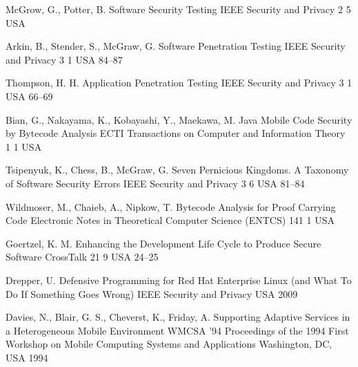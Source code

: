 \begin{thebibliography}{9}
		{McGrow, G., Potter, B.} %
		{Software Security Testing}
		{{IEEE} Security and Privacy}
		{2}
		{5}
		{USA}
		{}
		{}
	
		{Arkin, B., Stender, S., McGraw, G.} %
		{Software Penetration Testing}
		{{IEEE} Security and Privacy}
		{3}
		{1}
		{USA}
		{}
		{84--87}
	
		{Thompson, H. H.} %
		{Application Penetration Testing}
		{{IEEE} Security and Privacy}
		{3}
		{1}
		{USA}
		{}
		{66--69}
	
		{Bian, G., Nakayama, K., Kobayashi, Y., Maekawa, M.} %
		{Java Mobile Code Security by Bytecode Analysis}
		{{ECTI} Transactions on Computer and Information Theory}
		{1}
		{1}
		{USA}
		{}
		{}
	
		{Tsipenyuk, K., Chess, B., McGraw, G.} %
		{Seven Pernicious Kingdoms. A Taxonomy of Software Security Errors}
		{{IEEE} Security and Privacy}
		{3}
		{6}
		{USA}
		{}
		{81--84}
	
		{Wildmoser, M., Chaieb, A., Nipkow, T.} %
		{Bytecode Analysis for Proof Carrying Code}
		{Electronic Notes in Theoretical Computer Science ({ENTCS})}
		{141}
		{1}
		{USA}
		{}
		{}
	
		{Goertzel, K. M.} %
		{Enhancing the Development Life Cycle to Produce Secure Software}
		{CrossTalk}
		{21}
		{9}
		{USA}
		{}
		{24--25}
	
		{Drepper, U.} %
		{Defensive Programming for {R}ed {H}at {E}nterprise {L}inux (and What To Do If Something Goes Wrong)}
		{{IEEE} Security and Privacy}
		{}
		{}
		{USA}
		{2009}
		{}
		

		{Davies, N., Blair, G. S., Cheverst, K., Friday, A.} %
		{Supporting Adaptive Services in a Heterogeneous Mobile Environment}
		{WMCSA '94 Proceedings of the 1994 First Workshop on Mobile Computing Systems and Applications}
		{Washington, DC, USA}
		{1994}
		

\end{thebibliography}
